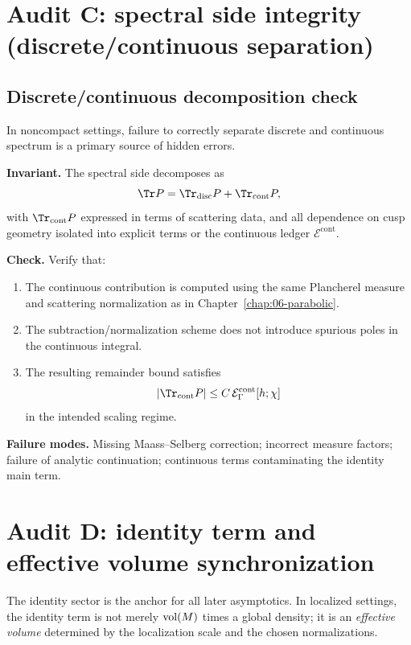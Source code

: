 \section{Audit C: spectral side integrity (discrete/continuous separation)}
\label{sec:E.audit.spectral}

\subsection{Discrete/continuous decomposition check}
\label{subsec:E.disccont}

In noncompact settings, failure to correctly separate discrete and continuous spectrum is a primary source of hidden
errors.

\begin{audit}
\label{audit:E.C1}
\textbf{Invariant.} The spectral side decomposes as
\[
\Tr P = \Tr_{\mathrm{disc}} P + \Tr_{\mathrm{cont}} P,
\]
with $\Tr_{\mathrm{cont}} P$ expressed in terms of scattering data, and all dependence on cusp geometry isolated into
explicit terms or the continuous ledger $\mathcal{E}^{\mathrm{cont}}$.

\textbf{Check.} Verify that:
\begin{enumerate}
\item The continuous contribution is computed using the same Plancherel measure and scattering normalization as in
Chapter~\ref{chap:06-parabolic}.
\item The subtraction/normalization scheme does not introduce spurious poles in the continuous integral.
\item The resulting remainder bound satisfies
\[
|\Tr_{\mathrm{cont}} P|\le C\,\mathcal{E}^{\mathrm{cont}}_\Gamma[h;\chi]
\]
in the intended scaling regime.
\end{enumerate}

\textbf{Failure modes.} Missing Maass--Selberg correction; incorrect measure factors; failure of analytic continuation;
continuous terms contaminating the identity main term.
\end{audit}

\section{Audit D: identity term and effective volume synchronization}
\label{sec:E.audit.identity}

The identity sector is the anchor for all later asymptotics.  In localized settings, the identity term is not merely
$\mathop{\mathrm{vol}}\nolimits(M)$ times a global density; it is an \emph{effective volume} determined by the localization scale and the chosen
normalizations.

